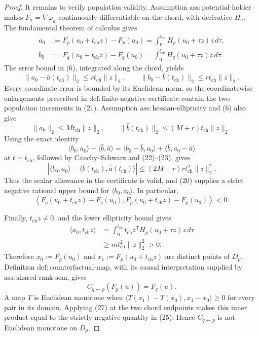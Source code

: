 \documentclass{article}
\begin{document}
\begin{proof}
It remains to verify population validity.  Assumption \(\mathrm{ass:potential\text{-}holder}\) makes \(F_a=\nabla\varphi_a\) continuously differentiable on the chord, with derivative \(H_a\).  The fundamental theorem of calculus gives
\[
 \begin{aligned}
 a_0&:=F_p(u_0+t_{\mathrm{ch}}z)-F_p(u_0)
 =\int_0^{t_{\mathrm{ch}}}H_p(u_0+\tau z)z\,d\tau,\\
 b_0&:=F_q(u_0+t_{\mathrm{ch}}z)-F_q(u_0)
 =\int_0^{t_{\mathrm{ch}}}H_q(u_0+\tau z)z\,d\tau.
 \end{aligned}
 \tag{21}
\]
The error bound in (6), integrated along the chord, yields
\[
 \lVert a_0-\widehat a(t_{\mathrm{ch}})\rVert_2
 \le rt_{\mathrm{ch}}\lVert z\rVert_2,
 \qquad
 \lVert b_0-\widehat b(t_{\mathrm{ch}})\rVert_2
 \le rt_{\mathrm{ch}}\lVert z\rVert_2.
 \tag{22}
\]
Every coordinate error is bounded by its Euclidean norm, so the coordinatewise enlargements prescribed in \(\mathrm{def:finite\text{-}negative\text{-}certificate}\) contain the two population increments in (21).  Assumption \(\mathrm{ass:hessian\text{-}ellipticity}\) and (6) also give
\[
 \lVert a_0\rVert_2\le Mt_{\mathrm{ch}}\lVert z\rVert_2,
 \qquad
 \lVert\widehat b(t_{\mathrm{ch}})\rVert_2
 \le(M+r)t_{\mathrm{ch}}\lVert z\rVert_2.
 \tag{23}
\]
Using the exact identity
\[
 \langle b_0,a_0\rangle-
 \langle\widehat b,\widehat a\rangle
 =\langle b_0-\widehat b,a_0\rangle
  +\langle\widehat b,a_0-\widehat a\rangle
\]
at \(t=t_{\mathrm{ch}}\), followed by Cauchy--Schwarz and (22)--(23), gives
\[
 \left|\langle b_0,a_0\rangle-
 \langle\widehat b(t_{\mathrm{ch}}),
          \widehat a(t_{\mathrm{ch}})\rangle\right|
 \le(2M+r)r t_{\mathrm{ch}}^2\lVert z\rVert_2^2.
 \tag{24}
\]
Thus the scalar allowance in the certificate is valid, and (20) supplies a strict negative rational upper bound for \(\langle b_0,a_0\rangle\).  In particular,
\[
 \left\langle F_q(u_0+t_{\mathrm{ch}}z)-F_q(u_0),
 F_p(u_0+t_{\mathrm{ch}}z)-F_p(u_0)\right\rangle<0.
 \tag{25}
\]

Finally, \(t_{\mathrm{ch}}z\ne0\), and the lower ellipticity bound gives
\[
 \begin{aligned}
 \langle a_0,t_{\mathrm{ch}}z\rangle
 &=\int_0^{t_{\mathrm{ch}}}
 t_{\mathrm{ch}}z^{\mathsf T}H_p(u_0+\tau z)z\,d\tau\\
 &\ge m t_{\mathrm{ch}}^2\lVert z\rVert_2^2>0.
 \end{aligned}
 \tag{26}
\]
Therefore \(x_0:=F_p(u_0)\) and \(x_1:=F_p(u_0+t_{\mathrm{ch}}z)\) are distinct points of \(D_p\).  Definition \(\mathrm{def:counterfactual\text{-}map}\), with its causal interpretation supplied by \(\mathrm{ass:shared\text{-}rank\text{-}scm}\), gives
\[
 C_{q\leftarrow p}(F_p(u))=F_q(u).
 \tag{27}
\]
A map \(T\) is Euclidean monotone when \(\langle T(x_1)-T(x_0),x_1-x_0\rangle\ge0\) for every pair in its domain.  Applying (27) at the two chord endpoints makes this inner product equal to the strictly negative quantity in (25).  Hence \(C_{q\leftarrow p}\) is not Euclidean monotone on \(D_p\).
\end{proof}
\end{document}
